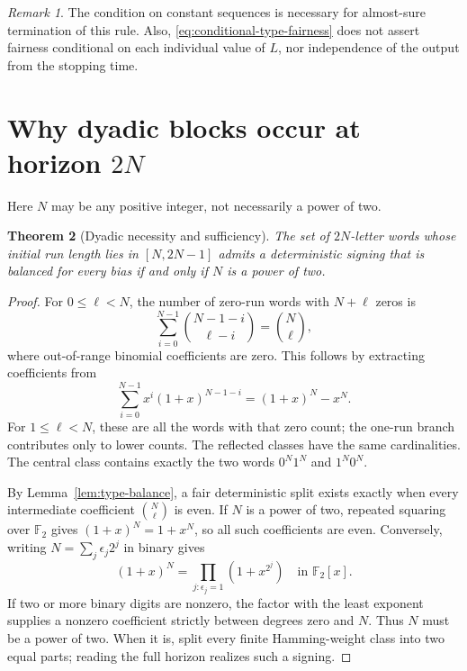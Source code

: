 \documentclass[11pt]{article}
\newtheorem{theorem}{Theorem}[section]
\theoremstyle{definition}
\theoremstyle{remark}
\newtheorem{remark}[theorem]{Remark}
\begin{document}
\begin{remark}
The condition on constant sequences is necessary for almost-sure
termination of this rule. Also, \eqref{eq:conditional-type-fairness} does
not assert fairness conditional on each individual value of $L$, nor
independence of the output from the stopping time.
\end{remark}

\section{Why dyadic blocks occur at horizon \texorpdfstring{$2N$}{2N}}\label{sec:dyadic-necessity}

Here $N$ may be any positive integer, not necessarily a power of two.

\begin{theorem}[Dyadic necessity and sufficiency]\label{thm:dyadic-iff}
The set of $2N$-letter words whose initial run length lies in $[N,2N-1]$
admits a deterministic signing that is balanced for every bias if and
only if $N$ is a power of two.
\end{theorem}
\begin{proof}
For $0\le\ell<N$, the number of zero-run words with $N+\ell$ zeros is
\[
 \sum_{i=0}^{N-1}\binom{N-1-i}{\ell-i}=\binom N\ell,
\]
where out-of-range binomial coefficients are zero. This follows by
extracting coefficients from
\[
 \sum_{i=0}^{N-1}x^i(1+x)^{N-1-i}=(1+x)^N-x^N.
\]
For $1\le\ell<N$, these are all the words with that zero count; the
one-run branch contributes only to lower counts. The reflected classes
have the same cardinalities. The central class contains exactly the two
words $0^N1^N$ and $1^N0^N$.

By Lemma~\ref{lem:type-balance}, a fair deterministic split exists
exactly when every intermediate coefficient $\binom N\ell$ is even.
If $N$ is a power of two, repeated squaring over $\mathbb F_2$ gives
$(1+x)^N=1+x^N$, so all such coefficients are even. Conversely, writing
$N=\sum_j\epsilon_j2^j$ in binary gives
\[
 (1+x)^N=\prod_{j:\epsilon_j=1}(1+x^{2^j})\quad\text{in }\mathbb F_2[x].
\]
If two or more binary digits are nonzero, the factor with the least
exponent supplies a nonzero coefficient strictly between degrees zero
and $N$. Thus $N$ must be a power of two. When it is, split every finite
Hamming-weight class into two equal parts; reading the full horizon
realizes such a signing.
\end{proof}
\end{document}
